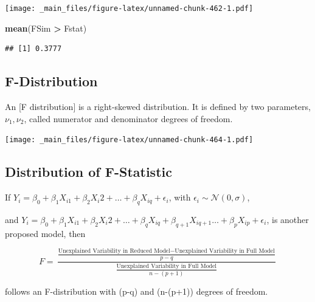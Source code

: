 \documentclass[]{book}
\newenvironment{Shaded}{\begin{snugshade}}{\end{snugshade}}
\newcommand{\KeywordTok}[1]{\textcolor[rgb]{0.13,0.29,0.53}{\textbf{#1}}}
\newcommand{\DecValTok}[1]{\textcolor[rgb]{0.00,0.00,0.81}{#1}}
\newcommand{\StringTok}[1]{\textcolor[rgb]{0.31,0.60,0.02}{#1}}
\newcommand{\OperatorTok}[1]{\textcolor[rgb]{0.81,0.36,0.00}{\textbf{#1}}}
\newcommand{\NormalTok}[1]{#1}
\begin{document}
\begin{Shaded}
\end{Shaded}

\texttt{[image: \_main\_files/figure-latex/unnamed-chunk-462-1.pdf]}

\begin{Shaded}
\begin{Highlighting}[]
\KeywordTok{mean}\NormalTok{(FSim }\OperatorTok{>}\StringTok{ }\NormalTok{Fstat)}
\end{Highlighting}
\end{Shaded}

\begin{verbatim}
## [1] 0.3777
\end{verbatim}

\subsection{F-Distribution}\label{f-distribution-1}

An {[}F distribution{]} is a right-skewed distribution. It is defined by
two parameters, \(\nu_1, \nu_2\), called numerator and denominator
degrees of freedom.

\texttt{[image: \_main\_files/figure-latex/unnamed-chunk-464-1.pdf]}

\subsection{Distribution of
F-Statistic}\label{distribution-of-f-statistic}

If
\(Y_i = \beta_0 + \beta_1X_{i1} + \beta_2{X_i2} + \ldots + \beta_qX_{iq} + \epsilon_i\),
with \(\epsilon_i\sim\mathcal{N}(0,\sigma)\),

and
\(Y_i = \beta_0 + \beta_1X_{i1} + \beta_2{X_i2} + \ldots + \beta_qX_{iq} + \beta_{q+1}X_{i{q+1}} \ldots + \beta_pX_{ip}+ \epsilon_i\),
is another proposed model, then

\[
F=\frac{\frac{\text{Unexplained Variability in Reduced Model}-\text{Unexplained Variability in Full Model}}{p-q}}{\frac{\text{Unexplained Variability in Full Model}}{n-(p+1)}}
\]

follows an F-distribution with (p-q) and (n-(p+1)) degrees of freedom.
\end{document}
